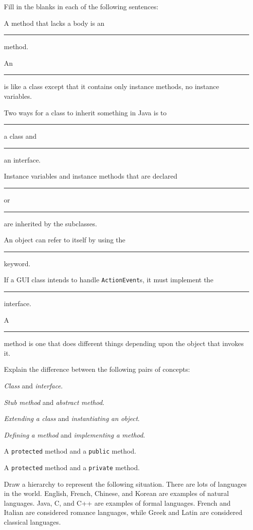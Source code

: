 \begin{EXRtwo}

\item  Fill in the blanks in each of the following sentences:

\begin{EXRtwoLL}
\baselineskip=13pt
\item  A method that lacks a body is an \rule{40pt}{0.5pt} method.
\item  An \rule{40pt}{0.5pt} is like a class except that it contains
only instance methods, no instance variables.
\item  Two ways for a class to inherit something in Java is to  \rule{40pt}{0.5pt}
a class and \rule{40pt}{0.5pt}  an interface.
\item  Instance variables and instance methods that are declared
 \rule{40pt}{0.5pt}  or \rule{40pt}{0.5pt}  are inherited by the subclasses.
\item  An object can refer to itself by using the \rule{40pt}{0.5pt} keyword.
\item  If a GUI class intends to handle {\tt ActionEvent}s, it must
implement the \rule{40pt}{0.5pt} interface.
\item   A \rule{40pt}{0.5pt} method is one 
that  does different things depending upon the object that invokes it.
\end{EXRtwoLL}

\baselineskip=11pt\item  Explain the difference between the following pairs of
concepts:

\begin{EXRtwoLL}
\item  {\it Class} and {\it interface}.
\item  {\it Stub method} and {\it abstract method}.
\item  {\it Extending a class} and {\it instantiating an object}.
\item  {\it Defining a method} and {\it implementing a method}.
\item  A {\tt protected} method and a {\tt public} method.
\item  A {\tt protected} method and a {\tt private} method.
\end{EXRtwoLL}

\item  Draw a hierarchy to represent the following situation.
There are lots of languages in the world.  English, French, Chinese,
and Korean are examples of natural languages.  Java, C, and C++ are
examples of formal languages.  French and Italian are considered
romance languages, while Greek and Latin are considered classical
languages.


\end{EXRtwo}
